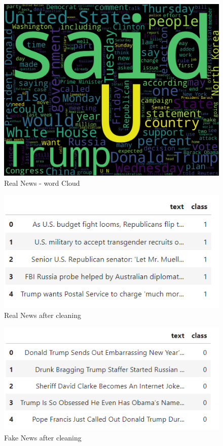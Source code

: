 \begin{figure}
    \centering
    \includegraphics[width=0.75\linewidth]{figures/realnews_wordcloud.pdf}
    \caption{Real News - word Cloud}
    \label{fig:enter-label}
\end{figure}

\begin{figure}
    \centering
    \includegraphics[width=0.75\linewidth]{figures/RealNews_after_preprocessing.png}
    \caption{Real News after cleaning}
    \label{fig:enter-label}
\end{figure}

\begin{figure}
    \centering
    \includegraphics[width=0.75\linewidth]{figures/FakeNews_after_preprocessing.png}
    \caption{Fake News after cleaning}
    \label{fig:enter-label}
\end{figure}

